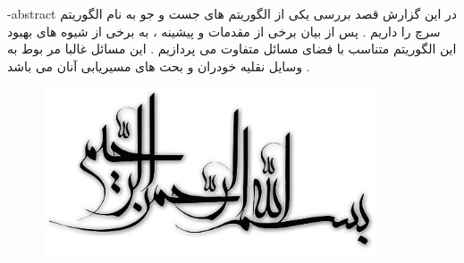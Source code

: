 \graphicspath{ {./img} }
\fa-abstract{
در این گزارش قصد بررسی یکی از الگوریتم های جست و جو به نام الگوریتم سرچ 
را داریم . پس از بیان برخی از مقدمات و پیشینه ، به برخی از شیوه های بهبود این الگوریتم متناسب با فضای مسائل متفاوت می پردازیم . این مسائل غالبا مر بوط به وسایل نقلیه خودران و بحث های مسیریابی آنان می باشد .
}


\renewcommand{\bibname}{مراجع}



\AUTtitle
\vspace*{7cm}
\thispagestyle{empty}
\begin{center}
\includegraphics[height=5cm,width=12cm]{besm}
\end{center}